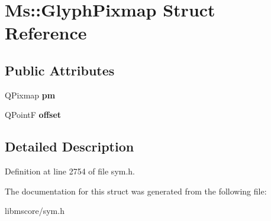 \hypertarget{struct_ms_1_1_glyph_pixmap}{}\section{Ms\+:\+:Glyph\+Pixmap Struct Reference}
\label{struct_ms_1_1_glyph_pixmap}
\subsection*{Public Attributes}
\begin{DoxyCompactItemize}
\item 
\mbox{\label{struct_ms_1_1_glyph_pixmap_a272f7ad06c64101e65b5e548a823fa21}} 
Q\+Pixmap {\bfseries pm}
\item 
\mbox{\label{struct_ms_1_1_glyph_pixmap_a2ce2d8c2942d1babfaae081ea75d7fa4}} 
Q\+PointF {\bfseries offset}
\end{DoxyCompactItemize}


\subsection{Detailed Description}


Definition at line 2754 of file sym.\+h.



The documentation for this struct was generated from the following file\+:\begin{DoxyCompactItemize}
\item 
libmscore/sym.\+h\end{DoxyCompactItemize}
